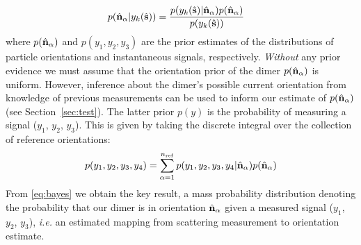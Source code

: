 \documentclass[12pt]{spieman}
\begin{document}
\begin{spacing}{1.5}
\begin{align}
  \label{eq:bayes}
  p(\hat{\bf n}_\alpha| y_k(\hat{\bf s}))
  &=
    \frac{p(y_k(\hat{\bf s})|\hat{\bf n}_\alpha)
    p(\hat{\bf n}_\alpha)}{p(y_k(\hat{\bf s}))}
\end{align}
where $p(\hat{\bf n}_\alpha)$ and $p(y_1, y_2, y_3)$ are the prior estimates of the distributions of particle orientations and instantaneous signals, respectively.
\textit{Without} any prior evidence we must assume that the orientation prior of the dimer
$p(\hat{\bf n}_{\alpha})$ is uniform. However, inference about the dimer's possible current orientation from knowledge of previous
measurements can be used to inform our estimate of $p(\hat{\bf n}_{\alpha})$ (see Section~\ref{sec:test}). The latter prior $p(y)$ is the probability of measuring a signal ($y_1$, $y_2$, $y_3$).  This is given by taking the discrete integral over the collection of reference orientations:
\begin{align}
  p(y_1, y_2, y_3, y_4)
  =
  \sum_{\alpha=1}^{n_{\rm ref}}
  p(y_1, y_2, y_3, y_4|\hat{\bf n}_\alpha)
  p(\hat{\bf n}_\alpha)
\end{align}
From \eqref{eq:bayes} we obtain the key result, a mass probability distribution denoting the
probability that our dimer is in orientation $\hat{\bf n}_{\alpha}$ given a measured
signal ($y_1$, $y_2$, $y_3$), \textit{i.e.} an estimated mapping from scattering measurement to orientation estimate. 


\end{spacing}
\end{document}
